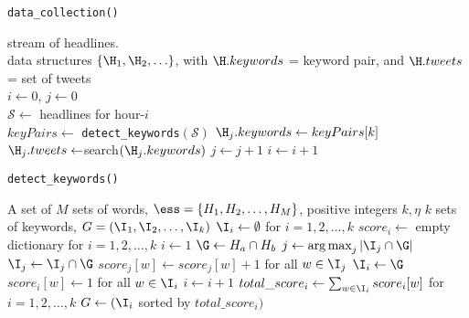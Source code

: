 \begin{algorithm}
  \caption{{\tt data\_collection()}}
  \label{alg:data_collection}
  \begin{algorithmic}[1]
    \REQUIRE stream of headlines. \\
    \ENSURE data structures $\{\H_1, \H_2, \ldots \}$, with $\H.keywords$ = keyword pair, and $\H.tweets$ = set of tweets\\
    \STATE $i \leftarrow 0$, $j \leftarrow 0$ \\
    \LOOP
    \STATE $\mathcal{S} \leftarrow$ headlines for hour-$i$ \\
    \STATE $keyPairs \leftarrow$ {\tt detect\_keywords$(\mathcal{S})$}
     
    \STATE $\H_j.keywords \leftarrow keyPairs[k]$ \\
    \STATE $\H_j.tweets \leftarrow $search$(\H_j.keywords)$
     \STATE $j \leftarrow j+1$
    \ENDFOR
    \STATE $i \leftarrow i+1$
    \ENDLOOP
  \end{algorithmic}
\end{algorithm}


\begin{algorithm}
  \caption{\tt{detect\_keywords()}}
  \label{alg:detect_keywords}
  \begin{algorithmic}[1]
    \REQUIRE A set of $M$ sets of words, $\ess= \{H_1,H_2, \ldots,
    H_M\}$, positive integers $k, \eta$ \ENSURE $k$ sets of keywords,
    $G = (\I_1,\I_2,\ldots,\I_{k})$ \STATE $\I_i \leftarrow \emptyset$
    for $i = 1,2,
    \ldots,k$ %
    \STATE $score_i \leftarrow$ empty dictionary for $i = 1, 2,
    \ldots,k$ %
    \STATE $i \leftarrow 1$  \STATE $\G
    \leftarrow H_a \cap H_b$
    \label{alg:line:intersect} %
    \STATE $j \leftarrow \operatorname{arg\,max}_j |\I_j \cap \G|$
     \STATE $\I_j \leftarrow \I_j \cap
    \G$ \STATE $score_{j}[w] \leftarrow score_{j}[w] + 1$ for all $w
    \in \I_j$ \ELSE \STATE $\I_i \leftarrow
    \G$ \label{alg:line:create} \STATE $score_{i}[w] \leftarrow 1$ for
    all $w \in \I_i$ \STATE $i \leftarrow i + 1$
    \ENDIF
    \ENDFOR
    \STATE $total\_score_i \leftarrow \sum_{w \in \I_i} score_{i}[w]$
    for $i = 1,2,\ldots,k$ \RETURN $G \leftarrow (\I_i$ sorted by
    $total\_score_i)$
  \end{algorithmic}
\end{algorithm}


